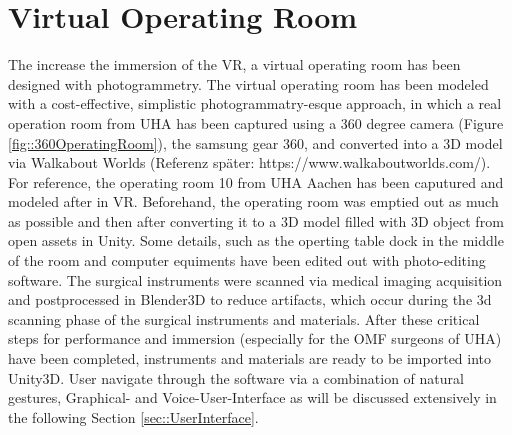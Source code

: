 \section{\label{sec::VitualOperatingRoom}Virtual Operating Room}
The increase the immersion of the VR, a virtual operating room has been designed with photogrammetry.
The virtual operating room has been modeled with a cost-effective, simplistic photogrammatry-esque approach, in which a real operation room from UHA has been captured using a 360 degree camera (Figure \ref{fig::360OperatingRoom}), the samsung gear 360, and converted into a 3D model via Walkabout Worlds (Referenz später: https://www.walkaboutworlds.com/).
For reference, the operating room 10 from UHA Aachen has been caputured and modeled after in VR.
Beforehand, the operating room was emptied out as much as possible and then after converting it to a 3D model filled with 3D object from open assets in Unity.
Some details, such as the operting table dock in the middle of the room and computer equiments have been edited out with photo-editing software.
The surgical instruments were scanned via medical imaging acquisition and postprocessed in Blender3D to reduce artifacts, which occur during the 3d scanning phase of the surgical instruments and materials.
After these critical steps for performance and immersion (especially for the OMF surgeons of UHA) have been completed, instruments and materials are ready to be imported into Unity3D.
User navigate through the software via a combination of natural gestures, Graphical- and Voice-User-Interface as will be discussed extensively in the following Section \ref{sec::UserInterface}.

